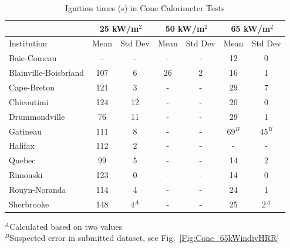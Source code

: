 \documentclass{book}
\begin{document}
\begin{table}[ht]
\caption{Ignition times (s) in Cone Calorimeter Tests}
\label{Table_12}
\begin{center}
\begin{tabular}{|l|cc|cc|cc|}
\hline
                         & \multicolumn{2}{|c|}{25 kW/m$^2$} &  \multicolumn{2}{|c|}{50 kW/m$^2$} & \multicolumn{2}{|c|}{65 kW/m$^2$}    \\ \hline
Institution              & Mean     & Std Dev                & Mean      & Std Dev                & Mean     & Std Dev                   \\ \hline
Baie-Comeau              & -        & -                      & -         & -                      & 12       & 0                         \\
Blainville-Boisbriand    & 107      & 6                      & 26        & 2                      & 16       & 1                         \\
Cape-Breton              & 121      & 3                      & -         & -                      & 29       & 7                         \\
Chicoutimi               & 124      & 12                     & -         & -                      & 20       & 0                         \\
Drummondville            & 76       & 11                     & -         & -                      & 29       & 1                         \\
Gatineau                 & 111      & 8                      & -         & -                      & 69$^B$   & 45$^B$                    \\
Halifax                  & 112      & 2                      & -         & -                      & -        & -                         \\
Quebec                   & 99       & 5                      & -         & -                      & 14       & 2                         \\
Rimouski                 & 123      & 0                      & -         & -                      & 14       & 0                         \\
Rouyn-Noranda            & 114      & 4                      & -         & -                      & 24       & 1                         \\
Sherbrooke               & 148      & 4$^A$                  & -         & -                      & 25       & 2$^A$                     \\ \hline
\end{tabular}
\end{center}
$^A$Calculated based on two values     \\
$^B$Suspected error in submitted dataset, see Fig.~\ref{Fig:Cone_65kWindivHRR}
\end{table}
\end{document}
